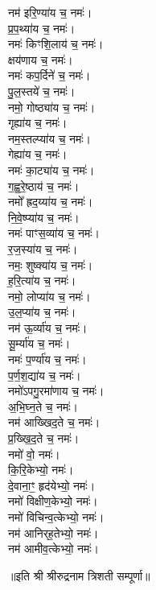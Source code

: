 \begin{multicols}{2}
\begin{flushleft}
नम॑ इरि॒ण्या॑य च॒ नमः॑।\\
प्र॒प॒थ्या॑य च॒ नमः॑।\\
नमः॑ किꣳशि॒लाय॑ च॒ नमः॑।\\
क्षय॑णाय च॒ नमः॑।\\
नमः॑ कप॒र्दिने॑ च॒ नमः॑।\hfill {}\\
पु॒ल॒स्तये॑ च॒ नमः॑।\\
नमो॒ गोष्ठ्या॑य च॒ नमः॑।\\
गृह्या॑य च॒ नमः॑।\\
नम॒स्तल्प्या॑य च॒ नमः॑।\\
गेह्या॑य च॒ नमः॑।\\
नमः॑ का॒ट्या॑य च॒ नमः॑।\\
ग॒ह्व॒रे॒ष्ठाय॑ च॒ नमः॑।\\
नमो᳚ ह्रद॒य्या॑य च॒ नमः॑।\\
नि॒वे॒ष्प्या॑य च॒ नमः॑।\\
नमः॑ पाꣳस॒व्या॑य च॒ नमः॑।\hfill {}\\
र॒ज॒स्या॑य च॒ नमः॑।\\
नमः॒ शुष्क्या॑य च॒ नमः॑।\\
ह॒रि॒त्या॑य च॒ नमः॑।\\
नमो॒ लोप्या॑य च॒ नमः॑।\\
उ॒ल॒प्या॑य च॒ नमः॑।\\
नम॑ ऊ॒र्व्या॑य च॒ नमः॑।\\
सू॒र्म्या॑य च॒ नमः॑।\\
नमः॑ प॒र्ण्या॑य च॒ नमः॑।\\
प॒र्ण॒श॒द्या॑य च॒ नमः॑।\\
नमो॑ऽपगु॒रमा॑णाय च॒ नमः॑।\hfill {}\\
अ॒भि॒घ्न॒ते च॒ नमः॑।\\
नम॑ आख्खिद॒ते च॒ नमः॑।\\
प्र॒ख्खि॒द॒ते च॒ नमः॑।\\
नमो॑ वो॒ नमः॑।\\
कि॒रि॒केभ्यो॒ नमः॑।\\
दे॒वाना॒ꣳ॒ हृद॑येभ्यो॒ नमः॑।\\
नमो॑ विक्षीण॒केभ्यो॒ नमः॑।\\
नमो॑ विचिन्व॒त्केभ्यो॒ नमः॑।\\
नम॑ आनिर्‌ह॒तेभ्यो॒ नमः॑।\\
नम॑ आमीव॒त्केभ्यो॒ नमः॑।\hfill {}\\
\end{flushleft}
\end{multicols}
\centerline{॥इति श्री श्रीरुद्रनाम त्रिशती सम्पूर्णा॥}
